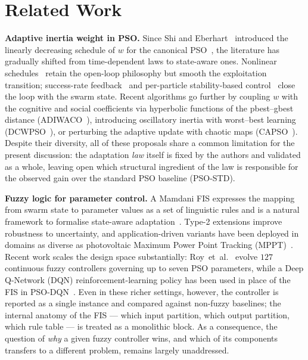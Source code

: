\documentclass[runningheads]{llncs}
\begin{document}
\section{Related Work}\label{sec:related}

\textbf{Adaptive inertia weight in PSO.} Since Shi and Eberhart~\cite{shi1998} introduced the linearly decreasing schedule of $w$ for the canonical PSO~\cite{kennedy1995}, the literature has gradually shifted from time-dependent laws to state-aware ones. Nonlinear schedules~\cite{chatterjee2006} retain the open-loop philosophy but smooth the exploitation transition; success-rate feedback~\cite{nickabadi2011} and per-particle stability-based control~\cite{taherkhani2015} close the loop with the swarm state. Recent algorithms go further by coupling $w$ with the cognitive and social coefficients via hyperbolic functions of the pbest--gbest distance (ADIWACO~\cite{sekyere2024}), introducing oscillatory inertia with worst--best learning (DCWPSO~\cite{han2024dcwpso}), or perturbing the adaptive update with chaotic maps (CAPSO~\cite{duan2022}). Despite their diversity, all of these proposals share a common limitation for the present discussion: the adaptation \emph{law} itself is fixed by the authors and validated as a whole, leaving open which structural ingredient of the law is responsible for the observed gain over the standard PSO baseline (PSO-STD).

\textbf{Fuzzy logic for parameter control.} A Mamdani FIS expresses the mapping from swarm state to parameter values as a set of linguistic rules and is a natural framework to formalise state-aware adaptation~\cite{melin2013,olivas2016}. Type-2 extensions improve robustness to uncertainty, and application-driven variants have been deployed in domains as diverse as photovoltaic Maximum Power Point Tracking (MPPT)~\cite{merchaoui2020}. Recent work scales the design space substantially: Roy~et~al.~\cite{roy2024} evolve $127$ continuous fuzzy controllers governing up to seven PSO parameters, while a Deep Q-Network (DQN) reinforcement-learning policy has been used in place of the FIS in PSO-DQN~\cite{shahouni2025}. Even in these richer settings, however, the controller is reported as a single instance and compared against non-fuzzy baselines; the internal anatomy of the FIS --- which input partition, which output partition, which rule table --- is treated as a monolithic block. As a consequence, the question of \emph{why} a given fuzzy controller wins, and which of its components transfers to a different problem, remains largely unaddressed.
\end{document}
